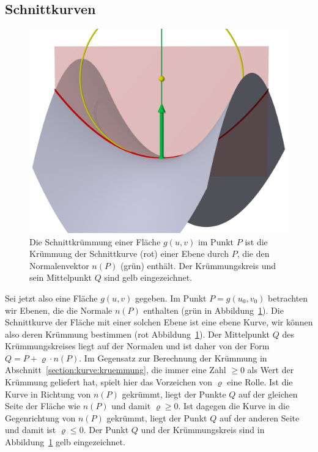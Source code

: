 \subsection{Schnittkurven%
\label{skript:kurven:schnittkurven}}
\begin{figure}
\centering
\includegraphics[width=\hsize]{chapters/3d/schnittkruemmung.jpg}
\caption{Die Schnittkrümmung einer Fläche $g(u,v)$ im Punkt $P$ ist
die Krümmung der Schnittkurve (rot) einer Ebene durch $P$, die den
Normalenvektor $n(P)$ (grün) enthält.
Der Krümmungskreis und sein Mittelpunkt $Q$ sind gelb eingezeichnet.
\label{skript:schnittkruemmung}}
\end{figure}
Sei jetzt also eine Fläche $g(u,v)$ gegeben.
Im Punkt $P=g(u_0,v_0)$ betrachten wir Ebenen, die die Normale $n(P)$
enthalten (grün in Abbildung~\ref{skript:schnittkruemmung}).
Die Schnittkurve der Fläche mit einer solchen Ebene ist eine ebene
Kurve, wir können also deren Krümmung bestimmen
(rot Abbildung~\ref{skript:schnittkruemmung}).
Der Mittelpunkt $Q$ des Krümmungskreises liegt auf der Normalen
und ist daher von der Form $Q = P + \varrho \cdot n(P)$.
Im Gegensatz zur Berechnung der Krümmung in
Abschnitt~\ref{section:kurve:kruemmung}, die immer eine Zahl $\ge 0$
als Wert der Krümmung geliefert hat, spielt hier das Vorzeichen von
$\varrho$ eine Rolle.
Ist die Kurve in Richtung von $n(P)$ gekrümmt, liegt der Punkte $Q$ auf der
gleichen Seite der Fläche wie $n(P)$ und damit $\varrho\ge 0$.
Ist dagegen die Kurve in die Gegenrichtung von $n(P)$ gekrümmt, liegt der
Punkt $Q$ auf der anderen Seite und damit ist $\varrho\le 0$.
Der Punkt $Q$ und der Krümmungskreis sind in
Abbildung~\ref{skript:schnittkruemmung} gelb eingezeichnet.

